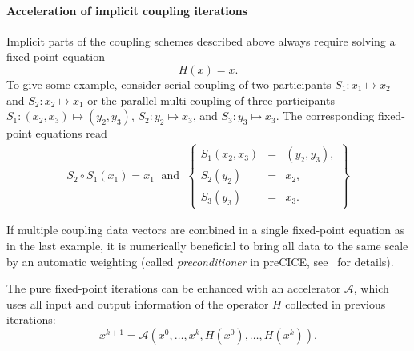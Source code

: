 \paragraph{Acceleration of implicit coupling iterations} 
Implicit parts of the coupling schemes described above always require solving a fixed-point equation
\begin{equation*}
H(x) = x.
\end{equation*}
To give some example, consider serial coupling of two participants $S_1: x_1 \mapsto x_2$ and $S_2: x_2 \mapsto x_1$ or the parallel multi-coupling of three participants $S_1: (x_2, x_3) \mapsto (y_2, y_3)$, $S_2: y_2 \mapsto x_3$, and $S_3: y_3 \mapsto x_3$. The corresponding fixed-point equations read
\begin{eqnarray*}
  S_2 \circ S_1(x_1) = x_1 \; \mbox{ and } \;
  \left\{ \begin{array}{ccc}
    S_1(x_2,x_3) & = & (y_2, y_3), \\
    S_2(y_2) & = &  x_2, \\
    S_3(y_3) & = & x_3. 
  \end{array} \right\}
\end{eqnarray*}

If multiple coupling data vectors are combined in a single fixed-point equation as in the last example, it is numerically beneficial to bring all data to the same scale by an automatic weighting (called \textit{preconditioner} in preCICE, see~\cite{Uekermann2016} for details). 

The pure fixed-point iterations can be enhanced with an accelerator $\mathcal{A}$, which uses all input and output information of the operator $H$ collected in previous iterations:
\begin{equation*}
x^{k+1}  =  \mathcal{A}(x^0,\ldots, x^k, H(x^0), \ldots, H(x^k)).
\end{equation*}

